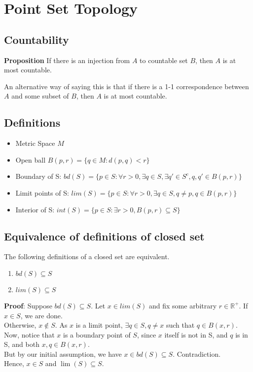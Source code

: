 \documentclass{article}
\begin{document}
\section{Point Set Topology}
\subsection{Countability}
\textbf{Proposition} If there is an injection from $A$ to countable set $B$, then $A$ is at most countable.

An alternative way of saying this is that if there is a 1-1 correspondence between $A$ and some subset of $B$, then $A$ is at most countable.

\subsection{Definitions}
\begin{itemize}
	\item Metric Space $M$
	\item Open ball $B(p,r)=\{q\in M : d(p,q) < r \}$
	\item Boundary of S: $bd(S)=\{p\in S : \forall r > 0, \exists q\in S, \exists q'\in S^c, q,q'\in B(p,r) \}$
	\item Limit points of S: $lim(S)=\{p\in S : \forall r > 0, \exists q\in S, q\neq p, q\in B(p,r) \}$
	\item Interior of S: $int(S)=\{p\in S : \exists r > 0, B(p,r)\subseteq S\}$
\end{itemize}
\subsection{Equivalence of definitions of closed set}
The following definitions of a closed set are equivalent.

\begin{enumerate}
	\item $bd(S)\subseteq S$
	\item $lim(S)\subseteq S$
\end{enumerate}

\textbf{Proof}: Suppose $bd(S)\subseteq S$. 
Let $x\in lim(S)$ and fix some arbitrary $r\in \mathbb{R}^+$.
If $x\in S$, we are done.\\
Otherwise,  $x\not \in S$. As $x$ is a limit point, $\exists q\in S, q\neq x$ such that $q\in B(x,r)$. Now, notice that $x$ is a boundary point of $S$, since $x$ itself is not in S, and $q$ is in S, and both $x,q\in B(x,r)$.\\
But by our initial assumption, we have $x\in bd(S)\subseteq S$. Contradiction.\\
Hence, $x\in S$ and $\lim(S)\subseteq S$.
\end{document}
